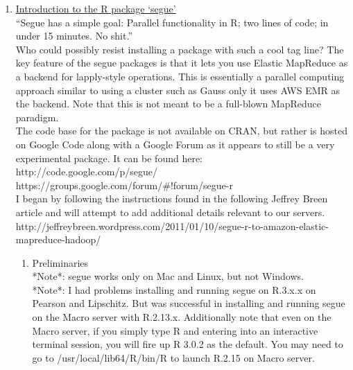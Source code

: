 \documentclass[a4paper, 11pt]{report}
\begin{document}
	\begin{enumerate}
		\item \Large\underline{Introduction to the R package `segue'}\normalsize \\

			``Segue has a simple goal: Parallel functionality in R; two lines of code; in under 15 minutes. No shit.'' \\
			
			Who could possibly resist installing a package with such a cool tag line? The key feature of the segue packages is that it lets you use Elastic MapReduce as a backend for lapply-style operations.  This is essentially a parallel computing approach similar to using a cluster such as Gauss only it uses AWS EMR as the backend.  Note that this is not meant to be a full-blown MapReduce paradigm.  \\
			
			The code base for the package is not available on CRAN, but rather is hosted on Google Code along with a Google Forum as it appears to still be a very experimental package.  It can be found here: \\
			http://code.google.com/p/segue/ \\		
			https://groups.google.com/forum/\#!forum/segue-r \\
			
			I began by following the instructions found in the following Jeffrey Breen article and will attempt to add additional details relevant to our servers. \\	 
			http://jeffreybreen.wordpress.com/2011/01/10/segue-r-to-amazon-elastic-mapreduce-hadoop/ \\
			
			\begin{enumerate}
			
				\item Preliminaries \\
					
					*Note*: segue works only on Mac and Linux, but not Windows. \\
					
					*Note*: I had problems installing and running segue on R.3.x.x on Pearson and Lipschitz.  But was successful in installing and running segue on the Macro server with R.2.13.x.  Additionally note that even on the Macro server, if you simply type R and entering into an interactive terminal session, you will fire up R 3.0.2 as the default.  You may need to go to /usr/local/lib64/R/bin/R to launch R.2.15 on Macro server. \\
					

\end{enumerate}
\end{enumerate}
\end{document}
